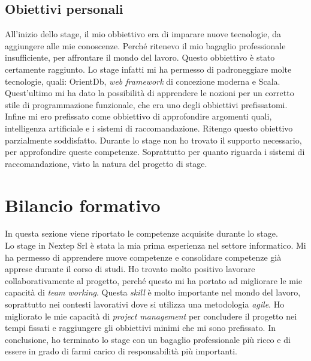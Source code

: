 \subsection{Obiettivi personali}
All'inizio dello stage, il mio obbiettivo era di imparare nuove tecnologie, da aggiungere alle mie conoscenze. Perché ritenevo il mio bagaglio professionale insufficiente, per affrontare il mondo del lavoro. Questo obbiettivo è stato certamente raggiunto. Lo stage infatti mi ha permesso di padroneggiare molte tecnologie, quali: OrientDb, \emph{web framework} di concezione moderna e Scala. Quest'ultimo mi ha dato la possibilità di apprendere le nozioni per un corretto stile di programmazione funzionale, che era uno degli obbiettivi prefissatomi. Infine mi ero prefissato come obbiettivo di approfondire argomenti quali, intelligenza artificiale e i sistemi di raccomandazione. Ritengo questo obiettivo parzialmente soddisfatto. Durante lo stage non ho trovato il supporto necessario, per approfondire queste competenze. Soprattutto per quanto riguarda i sistemi di raccomandazione, visto la natura del progetto di stage.




\section{Bilancio formativo}
In questa sezione viene riportato le competenze acquisite durante lo stage.\\
Lo stage in Nextep Srl è stata la  mia prima esperienza nel settore informatico. Mi ha permesso di apprendere nuove competenze e consolidare competenze già apprese durante il corso di studi.
Ho trovato molto positivo lavorare collaborativamente al progetto, perché questo mi ha portato ad migliorare le mie capacità di \emph{team working}. Questa \emph{skill} è molto importante nel mondo del lavoro, soprattutto nei contesti lavorativi dove si utilizza una metodologia \emph{agile}. Ho migliorato le mie capacità di \emph{project management} per concludere il progetto nei tempi fissati e raggiungere gli obbiettivi minimi che mi sono prefissato. In conclusione, ho terminato lo stage con un bagaglio professionale più ricco e di essere in grado di farmi carico di responsabilità più importanti.
